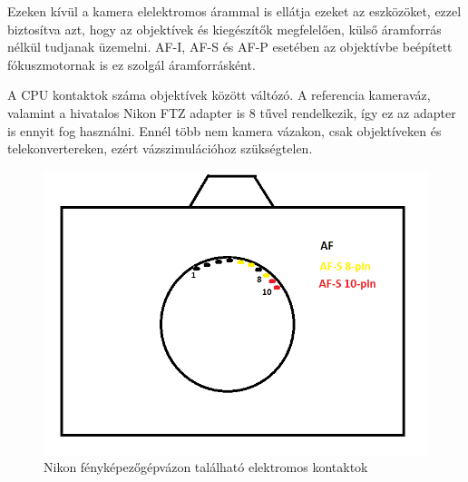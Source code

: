 Ezeken kívül a kamera elelektromos árammal is ellátja ezeket az eszközöket, ezzel biztosítva azt, hogy az objektívek és kiegészítők megfelelően, külső áramforrás nélkül tudjanak üzemelni.
AF-I, AF-S és AF-P esetében az objektívbe beépített fókuszmotornak is ez szolgál áramforrásként.

A CPU kontaktok száma objektívek között váltózó.\cite{Nikon_CPU}
A referencia kameraváz, valamint a hivatalos Nikon FTZ adapter is 8 tűvel rendelkezik, így ez az adapter is ennyit fog használni.
Ennél több nem kamera vázakon, csak objektíveken és telekonvertereken, ezért vázszimulációhoz szükségtelen.

\begin{figure}[H]
	\centering
	\includegraphics[width=0.5\linewidth]{img/Fmount.png}
	\caption{Nikon fényképezőgépvázon található elektromos kontaktok}
	\label{fig:FMount}
\end{figure}
\keepXColumns
